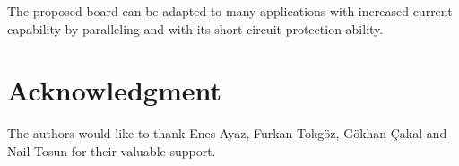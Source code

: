 \documentclass[journal]{IEEEtran}
\begin{document}
The proposed board can be adapted to many applications with increased current capability by paralleling and with its short-circuit protection ability.

\section*{Acknowledgment}

The authors would like to thank Enes Ayaz, Furkan Tokgöz, Gökhan Çakal and Nail Tosun for their valuable support.

\ifCLASSOPTIONcaptionsoff
  \newpage
\fi



\end{document}
